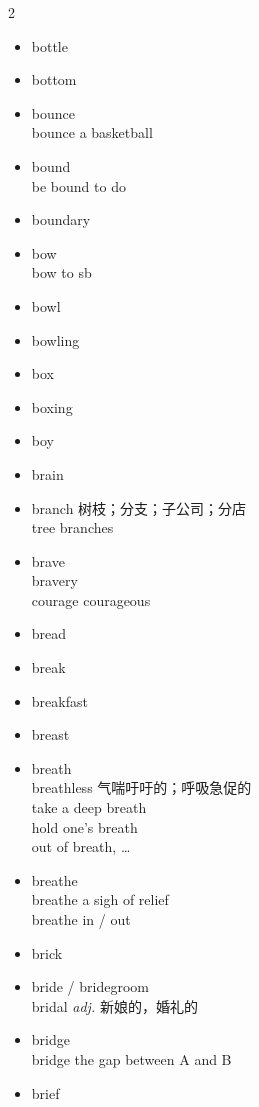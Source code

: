 \documentclass[../../book.tex]{subfiles}
\begin{document}
\begin{multicols}{2}
\begin{itemize}
\\\begin{tabular}{@{} r | @{\hspace{0.1em}} l @{}}
 & to do
\\& doing
\end{tabular}
\item[-] bottle
\item[-] bottom
\item[-] bounce
\\bounce a basketball
\item[-] bound
\\be bound to do
\item[-] boundary
\item[-] bow
\\bow to sb
\item[-] bowl
\item[-] bowling
\item[-] box
\item[-] boxing
\item[-] boy
\item[-] brain
\item[-] branch 树枝；分支；子公司；分店
\\tree branches
\item[-] brave
\\bravery
\\{\color{violet}courage courageous}
\item[-] bread
\item[-] break
\item[-] breakfast
\item[-] breast
\item[-] breath
\\breathless 气喘吁吁的；呼吸急促的
\\take a deep breath
\\hold one\textquoteright s breath
\\out of breath, \ldots
\item[-] breathe
\\breathe a sigh of relief
\\breathe in / out
\item[-] brick
\item[-] bride / bridegroom
\\bridal \emph{adj.} 新娘的，婚礼的
\item[-] bridge
\\bridge the gap between A and B
\item[-] brief

\end{itemize}
\end{multicols}
\end{document}
